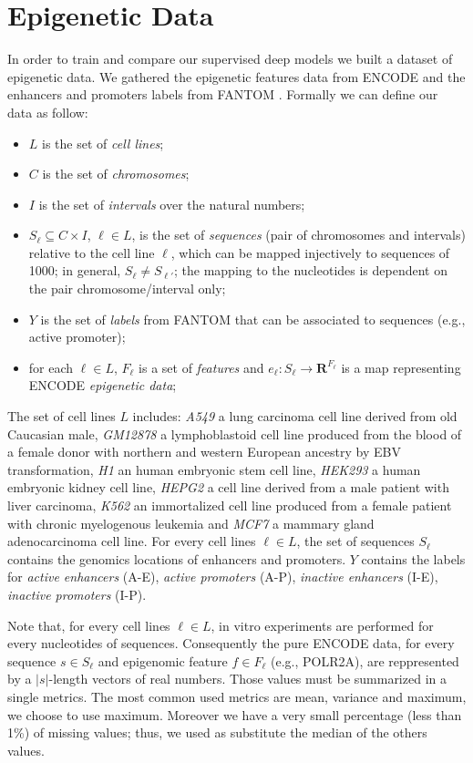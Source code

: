 \section{Epigenetic Data}
In order to train and compare our supervised deep models we built a dataset of epigenetic data. We gathered the epigenetic features data from ENCODE \cite{ENCODE_data} and the enhancers and promoters labels from FANTOM \cite{FANTOM_data}. Formally we can define our data as follow: 
\begin{itemize}
    \item $L$ is the set of \emph{cell lines};
    \item $C$ is the set of \emph{chromosomes};
    \item $I$ is the set of \emph{intervals} over the natural numbers;
    \item $S_\ell\subseteq C\times I$, $\ell\in L$, is the set of \emph{sequences} (pair of chromosomes and intervals) relative to the cell line $\ell$, which can be mapped injectively to sequences of 1000; in general, $S_\ell\neq S_{\ell'}$; the mapping to the nucleotides is dependent on the pair chromosome/interval only;
    \item $Y$ is the set of \emph{labels} from FANTOM that can be associated to sequences (e.g., active promoter);
    \item for each $\ell\in L$, $F_\ell$ is a set of \emph{features} and $e_\ell:S_\ell\to\mathbf R^{F_\ell}$ is a map representing ENCODE \emph{epigenetic data};
\end{itemize}
The set of cell lines $L$ includes: \emph{A549} a lung carcinoma cell line derived from old Caucasian male, \emph{GM12878} a lymphoblastoid cell line produced from the blood of a female donor with northern and western European ancestry by EBV transformation, \emph{H1} an human embryonic stem cell line, \emph{HEK293} a human embryonic kidney cell line, \emph{HEPG2} a cell line derived from a male patient with liver carcinoma, \emph{K562} an immortalized cell line produced from a female patient with chronic myelogenous leukemia and \emph{MCF7} a mammary gland adenocarcinoma cell line. For every cell lines $\ell \in L$, the set of sequences $S_\ell$ contains the genomics locations of enhancers and promoters. $Y$ contains the labels for \emph{active enhancers} (A-E), \emph{active promoters} (A-P), \emph{inactive enhancers} (I-E), \emph{inactive promoters} (I-P).

Note that, for every cell lines $\ell \in L$, in vitro experiments are performed for every nucleotides of sequences. Consequently the pure ENCODE data, for every sequence $s \in S_\ell$ and epigenomic feature $f \in F_\ell$ (e.g., POLR2A), are reppresented by a $|s|$-length vectors of real numbers. Those values must be summarized in a single metrics. The most common used metrics are mean, variance and maximum, we choose to use maximum. Moreover we have a very small percentage (less than 1\%) of missing values; thus, we used as substitute the median of the others values.

